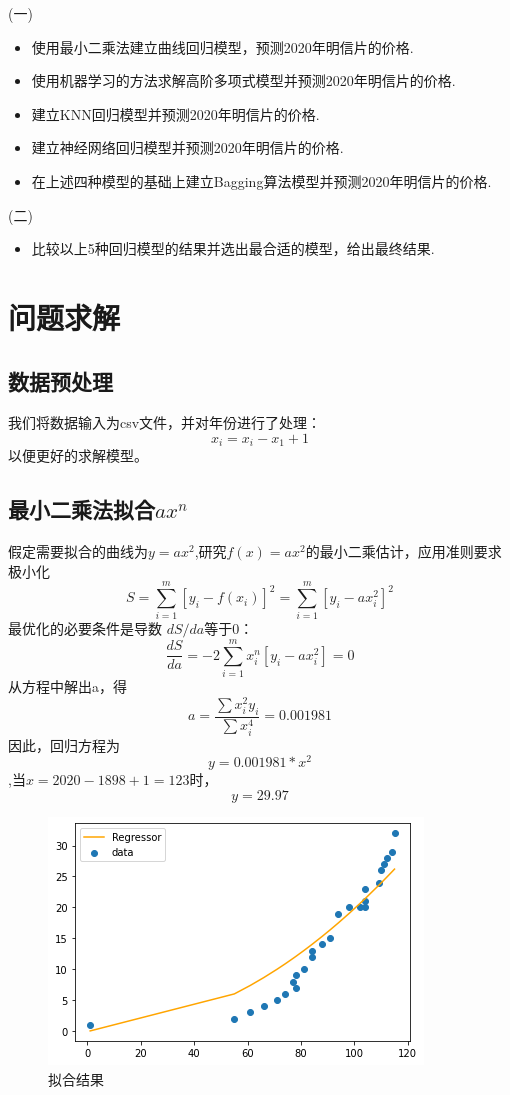 \noindent (一)
\begin{itemize}
\item 使用最小二乘法建立曲线回归模型，预测2020年明信片的价格.

\item 使用机器学习的方法求解高阶多项式模型并预测2020年明信片的价格.

\item 建立KNN回归模型并预测2020年明信片的价格.

\item 建立神经网络回归模型并预测2020年明信片的价格.

\item 在上述四种模型的基础上建立Bagging算法模型并预测2020年明信片的价格.
\end{itemize}

\noindent (二)
\begin{itemize}
\item 比较以上5种回归模型的结果并选出最合适的模型，给出最终结果.
\end{itemize}

\section{问题求解}
\subsection{数据预处理}
我们将数据输入为csv文件，并对年份进行了处理：
$$x_i=x_i-x_1 +1$$以便更好的求解模型。


\subsection{最小二乘法拟合$ax^n$}
假定需要拟合的曲线为$y=ax^2$,研究$f(x)=ax^2$的最小二乘估计，应用准则要求极小化$$S=\sum_{i=1}^m[y_i-f(x_i)]^2=\sum_{i=1}^m[y_i-ax_i^2]^2$$最优化的必要条件是导数 $dS/da$等于0：$$\frac{dS}{da}=-2\sum_{i=1}^mx_i^n[y_i-ax_i^2]=0$$从方程中解出a，得$$a=\frac{\sum x_i^2y_i}{\sum x_i^4}=0.001981$$
因此，回归方程为$$y=0.001981 * x^2$$,当$x=2020-1898+1=123$时，$$y=29.97$$


\begin{figure}[h]
	\centering
	\includegraphics[scale=0.5,angle=0]{images/9.png}
	\caption{拟合结果}
	\label{9}
\end{figure}

